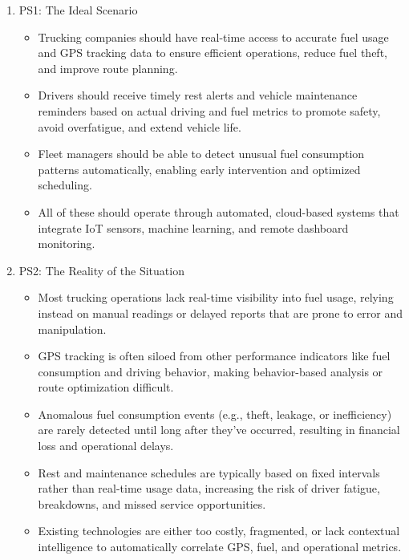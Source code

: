 \begin{enumerate}
	\item PS1: The Ideal Scenario
	\begin{itemize}
		\item Trucking companies should have real-time access to accurate fuel usage and GPS tracking data to ensure efficient operations, reduce fuel theft, and improve route planning.
		\item Drivers should receive timely rest alerts and vehicle maintenance reminders based on actual driving and fuel metrics to promote safety, avoid overfatigue, and extend vehicle life.
		\item Fleet managers should be able to detect unusual fuel consumption patterns automatically, enabling early intervention and optimized scheduling.
		\item All of these should operate through automated, cloud-based systems that integrate IoT sensors, machine learning, and remote dashboard monitoring.
	\end{itemize}
	
	\item PS2:  The Reality of the Situation
	\begin{itemize}
			\item Most trucking operations lack real-time visibility into fuel usage, relying instead on manual readings or delayed reports that are prone to error and manipulation.
			\item GPS tracking is often siloed from other performance indicators like fuel consumption and driving behavior, making behavior-based analysis or route optimization difficult.
			\item Anomalous fuel consumption events (e.g., theft, leakage, or inefficiency) are rarely detected until long after they’ve occurred, resulting in financial loss and operational delays.
			\item Rest and maintenance schedules are typically based on fixed intervals rather than real-time usage data, increasing the risk of driver fatigue, breakdowns, and missed service opportunities.
			\item Existing technologies are either too costly, fragmented, or lack contextual intelligence to automatically correlate GPS, fuel, and operational metrics.
	\end{itemize}
	

\end{enumerate}
